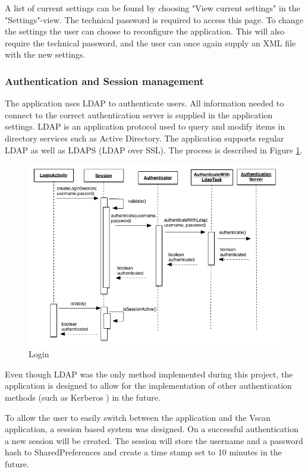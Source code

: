 A list of current settings can be found by choosing "View current settings" in the "Settings"-view. The technical password is required to access this page. To change the settings the user can choose to reconfigure the application. This will also require the technical password, and the user can once again supply an XML file with the new settings.

\subsubsection{Authentication and Session management}
\label{sessionimplement}
The application uses LDAP to authenticate users. All information needed to connect to the correct authentication server is supplied in the application settings. 
\noindent
LDAP is an application protocol used to query and modify items in directory services such as Active Directory. The application supports regular LDAP as well as LDAPS (LDAP over SSL). The process is described in Figure \ref{fig:login}.

\begin{figure}[H]
\centering
\includegraphics[scale=0.5]{img/sequence_auth.png}
\caption{Login}
\label{fig:login}
\end{figure}

\noindent
Even though LDAP was the only method implemented during this project, the application is designed to allow for the implementation of other authentication methods (such as Kerberos \cite{kerberos}) in the future.

To allow the user to easily switch between the application and the Vscan application, a session based system was designed. On a successful authentication a new session will be created. The session will store the username and a password hash to SharedPreferences and create a time stamp set to 10 minutes in the future. 

